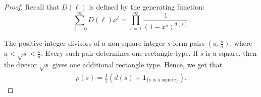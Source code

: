 \documentclass[12pt,a4paper]{amsart}
\numberwithin{equation}{section}
\theoremstyle{plain}
\theoremstyle{definition}
\theoremstyle{remark}
\begin{document}
\begin{proof}
Recall that $D(\ell)$ is defined by the generating function:
$$
\sum_{\ell=0}^{\infty}D(\ell)x^\ell
=
\prod_{s=1}^{\infty}\frac{1}{(1-x^s)^{d(s)}}.
$$

The positive integer divisors of a non-square integer $s$ form pairs $\left(a,\frac{s}{a}\right)$, where $a<\sqrt{s}<\frac{s}{a}$. Every such pair determines one rectangle type. If $s$ is a square, then the divisor $\sqrt{s}$ gives one additional rectangle type. Hence, we get that
\begin{align}\label{eq: rho}
    \rho(s)=\tfrac12\left(d(s)+\mathbf 1_{\{s\text{ is a square}\}}\right).
\end{align}


\end{proof}
\end{document}
